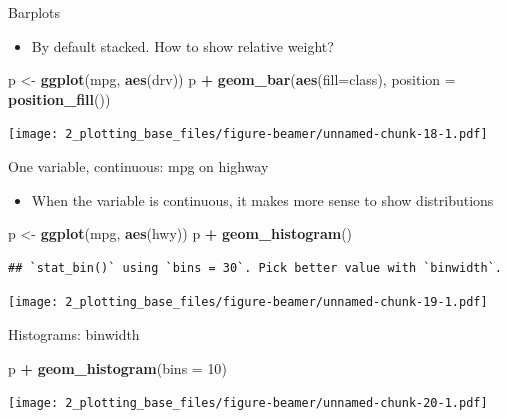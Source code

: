 \documentclass[
  ignorenonframetext,
]{beamer}
\newenvironment{Shaded}{\begin{snugshade}}{\end{snugshade}}
\newcommand{\DataTypeTok}[1]{\textcolor[rgb]{0.13,0.29,0.53}{#1}}
\newcommand{\DecValTok}[1]{\textcolor[rgb]{0.00,0.00,0.81}{#1}}
\newcommand{\KeywordTok}[1]{\textcolor[rgb]{0.13,0.29,0.53}{\textbf{#1}}}
\newcommand{\NormalTok}[1]{#1}
\newcommand{\OperatorTok}[1]{\textcolor[rgb]{0.81,0.36,0.00}{\textbf{#1}}}
\newcommand{\StringTok}[1]{\textcolor[rgb]{0.31,0.60,0.02}{#1}}
\providecommand{\tightlist}{%
  \setlength{\itemsep}{0pt}\setlength{\parskip}{0pt}}
\begin{document}
\begin{frame}[fragile]{Barplots}
\protect\hypertarget{barplots-5}{}

\begin{itemize}
\tightlist
\item
  By default stacked. How to show relative weight?
\end{itemize}

\begin{Shaded}
\begin{Highlighting}[]
\NormalTok{p <-}\StringTok{ }\KeywordTok{ggplot}\NormalTok{(mpg, }\KeywordTok{aes}\NormalTok{(drv))}
\NormalTok{p }\OperatorTok{+}\StringTok{ }\KeywordTok{geom_bar}\NormalTok{(}\KeywordTok{aes}\NormalTok{(}\DataTypeTok{fill=}\NormalTok{class), }\DataTypeTok{position =} \KeywordTok{position_fill}\NormalTok{())}
\end{Highlighting}
\end{Shaded}

\texttt{[image: 2\_plotting\_base\_files/figure-beamer/unnamed-chunk-18-1.pdf]}

\end{frame}

\begin{frame}[fragile]{One variable, continuous: mpg on highway}
\protect\hypertarget{one-variable-continuous-mpg-on-highway}{}

\begin{itemize}
\tightlist
\item
  When the variable is continuous, it makes more sense to show
  distributions
\end{itemize}

\begin{Shaded}
\begin{Highlighting}[]
\NormalTok{p <-}\StringTok{ }\KeywordTok{ggplot}\NormalTok{(mpg, }\KeywordTok{aes}\NormalTok{(hwy))}
\NormalTok{p }\OperatorTok{+}\StringTok{ }\KeywordTok{geom_histogram}\NormalTok{()}
\end{Highlighting}
\end{Shaded}

\begin{verbatim}
## `stat_bin()` using `bins = 30`. Pick better value with `binwidth`.
\end{verbatim}

\texttt{[image: 2\_plotting\_base\_files/figure-beamer/unnamed-chunk-19-1.pdf]}

\end{frame}

\begin{frame}[fragile]{Histograms: binwidth}
\protect\hypertarget{histograms-binwidth}{}

\begin{Shaded}
\begin{Highlighting}[]
\NormalTok{p }\OperatorTok{+}\StringTok{ }\KeywordTok{geom_histogram}\NormalTok{(}\DataTypeTok{bins =} \DecValTok{10}\NormalTok{)}
\end{Highlighting}
\end{Shaded}

\texttt{[image: 2\_plotting\_base\_files/figure-beamer/unnamed-chunk-20-1.pdf]}

\end{frame}
\end{document}
